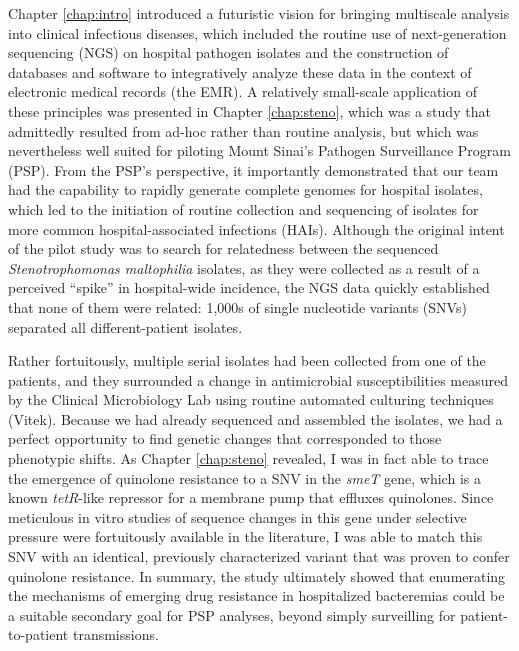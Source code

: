 Chapter \ref{chap:intro} introduced a futuristic vision for bringing multiscale analysis into clinical infectious diseases, which included the routine use of next-generation sequencing (NGS) on hospital pathogen isolates and the construction of databases and software to integratively analyze these data in the context of electronic medical records (the EMR). A relatively small-scale application of these principles was presented in Chapter \ref{chap:steno}, which was a study that admittedly resulted from ad-hoc rather than routine analysis, but which was nevertheless well suited for piloting Mount Sinai's Pathogen Surveillance Program (PSP). From the PSP's perspective, it importantly demonstrated that our team had the capability to rapidly generate complete genomes for hospital isolates, which led to the initiation of routine collection and sequencing of isolates for more common hospital-associated infections (HAIs). Although the original intent of the pilot study was to search for relatedness between the sequenced \emph{Stenotrophomonas maltophilia} isolates, as they were collected as a result of a perceived ``spike'' in hospital-wide incidence, the NGS data quickly established that none of them were related: 1,000s of single nucleotide variants (SNVs) separated all different-patient isolates.

Rather fortuitously, multiple serial isolates had been collected from one of the patients, and they surrounded a change in antimicrobial susceptibilities measured by the Clinical Microbiology Lab using routine automated culturing techniques (Vitek). Because we had already sequenced and assembled the isolates, we had a perfect opportunity to find genetic changes that corresponded to those phenotypic shifts. As Chapter \ref{chap:steno} revealed, I was in fact able to trace the emergence of quinolone resistance to a SNV in the \emph{smeT} gene, which is a known \emph{tetR}-like repressor for a membrane pump that effluxes quinolones. Since meticulous in vitro studies of sequence changes in this gene under selective pressure were fortuitously available in the literature,\autocite{Alonso1997,Sanchez2002} I was able to match this SNV with an identical, previously characterized variant that was proven to confer quinolone resistance. In summary, the study ultimately showed that enumerating the mechanisms of emerging drug resistance in hospitalized bacteremias could be a suitable secondary goal for PSP analyses, beyond simply surveilling for patient-to-patient transmissions.

